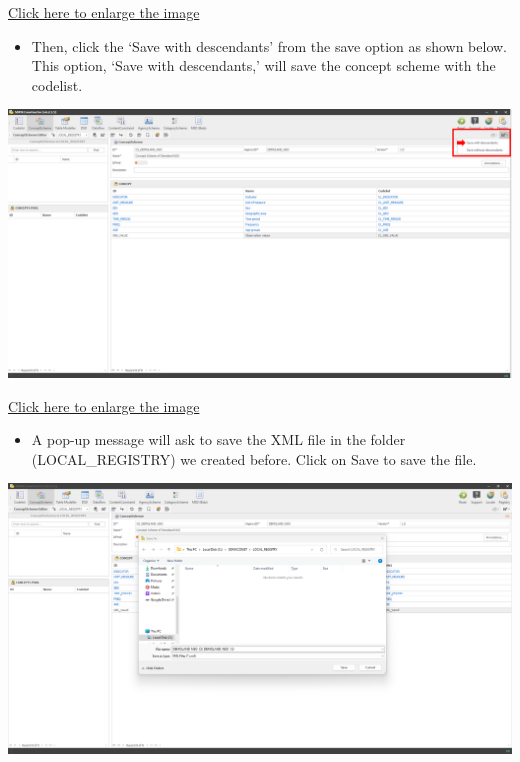 \documentclass[
]{book}
\providecommand{\tightlist}{%
  \setlength{\itemsep}{0pt}\setlength{\parskip}{0pt}}
\begin{document}
\href{images/image116.png}{Click here to enlarge the image}

\begin{itemize}
\tightlist
\item
  Then, click the `Save with descendants' from the save option as shown below. This option, `Save with descendants,' will save the concept scheme with the codelist.
\end{itemize}

\begin{center}\includegraphics[width=1\linewidth]{./images/image118} \end{center}

\href{images/image118.png}{Click here to enlarge the image}

\begin{itemize}
\tightlist
\item
  A pop-up message will ask to save the XML file in the folder (LOCAL\_REGISTRY) we created before. Click on Save to save the file.
\end{itemize}

\begin{center}\includegraphics[width=1\linewidth]{./images/image123} \end{center}
\end{document}
